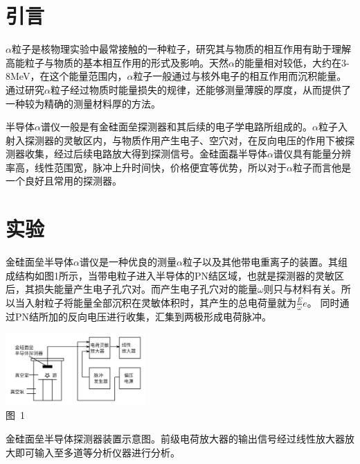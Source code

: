 \documentclass[a4paper,10.0pt,twoside]{npr}
\begin{document}
\begin{multicols}{2}

\section{引言}    %
\vspace*{-1mm}
\song\wuhao
$\alpha$粒子是核物理实验中最常接触的一种粒子，研究其与物质的相互作用有助于理解高能粒子与物质的基本相互作用的形式及影响。天然$\alpha$的能量相对较低，大约在3-8MeV，在这个能量范围内，$\alpha$粒子一般通过与核外电子的相互作用而沉积能量。通过研究$\alpha$粒子经过物质时能量损失的规律，还能够测量薄膜的厚度，从而提供了一种较为精确的测量材料厚的方法。

半导体$\alpha$谱仪一般是有金硅面垒探测器和其后续的电子学电路所组成的。$\alpha$粒子入射入探测器的灵敏区内，与物质作用产生电子、空穴对，在反向电压的作用下被探测器收集，经过后续电路放大得到探测信号。金硅面磊半导体$\alpha$谱仪具有能量分辨率高，线性范围宽，脉冲上升时间快，价格便宜等优势，所以对于$\alpha$粒子而言他是一个良好且常用的探测器。

\section{实验}
金硅面垒半导体$\alpha$谱仪是一种优良的测量$\alpha$粒子以及其他带电重离子的装置。其组成结构如图1所示，当带电粒子进入半导体的PN结区域，也就是探测器的灵敏区后，其损失能量产生电子孔穴对。而产生电子孔穴对的能量$\omega$则只与材料有关。所以当入射粒子将能量全部沉积在灵敏体积时，其产生的总电荷量就为$\frac{E}{\omega} e$。 同时通过PN结所加的反向电压进行收集，汇集到两极形成电荷脉冲。

\begin{center}
\includegraphics[width=0.4\textwidth]{tu1.png}\\
\xiaowu\song 图~1\begin{minipage}[t]{75mm} \quad 金硅面垒半导体探测器装置示意图。前级电荷放大器的输出信号经过线性放大器放大即可输入至多道等分析仪器进行分析。\\[-1mm]\wuhao
\end{minipage}
\end{center}


\end{multicols}
\end{document}
